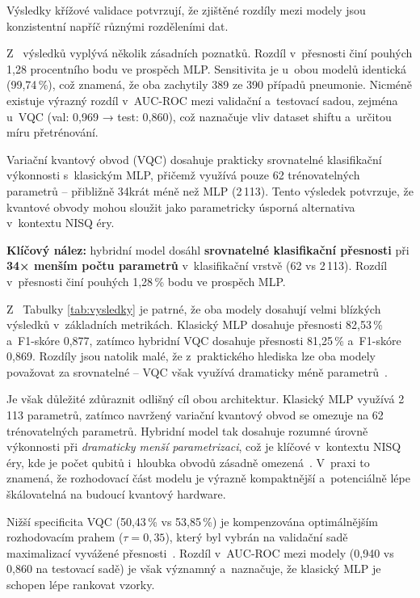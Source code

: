 \documentclass[12pt, a4paper]{report}
\begin{document}
Výsledky křížové validace potvrzují, že zjištěné rozdíly mezi modely jsou konzistentní napříč různými rozděleními dat.

Z ~výsledků vyplývá několik zásadních poznatků. Rozdíl v~přesnosti činí pouhých 1{,}28 procentního bodu ve prospěch MLP. Sensitivita je u~obou modelů identická (99{,}74\,\%), což znamená, že oba zachytily 389 ze 390 případů pneumonie. Nicméně existuje výrazný rozdíl v~AUC-ROC mezi validační a~testovací sadou, zejména u~VQC (val: 0{,}969 → test: 0{,}860), což naznačuje vliv dataset shiftu a~určitou míru přetrénování.

Variační kvantový obvod (VQC) dosahuje prakticky srovnatelné klasifikační výkonnosti s~klasickým MLP, přičemž využívá pouze 62 trénovatelných parametrů -- přibližně 34krát méně než MLP (2\,113). Tento výsledek potvrzuje, že kvantové obvody mohou sloužit jako parametricky úsporná alternativa v~kontextu NISQ éry.

\textbf{Klíčový nález:} hybridní model dosáhl \textbf{srovnatelné klasifikační přesnosti} při \textbf{34× menším počtu parametrů} v~klasifikační vrstvě (62 vs 2\,113). Rozdíl v~přesnosti činí pouhých 1{,}28\,\% bodu ve prospěch MLP.

Z ~Tabulky \ref{tab:vysledky} je patrné, že oba modely dosahují velmi blízkých výsledků v~základních metrikách. Klasický MLP dosahuje přesnosti 82{,}53\,\% a~F1-skóre 0{,}877, zatímco hybridní VQC dosahuje přesnosti 81{,}25\,\% a~F1-skóre 0{,}869. Rozdíly jsou natolik malé, že z~praktického hlediska lze oba modely považovat za srovnatelné -- VQC však využívá dramaticky méně parametrů~\cite{pneumonia_detection_qml}.

Je však důležité zdůraznit odlišný cíl obou architektur. Klasický MLP využívá 2\,113 parametrů, zatímco navržený variační kvantový obvod se omezuje na 62 trénovatelných parametrů. Hybridní model tak dosahuje rozumné úrovně výkonnosti při \emph{dramaticky menší parametrizaci}, což je klíčové v~kontextu NISQ éry, kde je počet qubitů i~hloubka obvodů zásadně omezená~\cite{mitarai_qcl}. V~praxi to znamená, že rozhodovací část modelu je výrazně kompaktnější a~potenciálně lépe škálovatelná na budoucí kvantový hardware.

Nižší specificita VQC (50{,}43\,\% vs 53{,}85\,\%) je kompenzována optimálnějším rozhodovacím prahem ($\tau = 0{,}35$), který byl vybrán na validační sadě maximalizací vyvážené přesnosti~\cite{radiologist_error_rate}. Rozdíl v~AUC-ROC mezi modely (0{,}940 vs 0{,}860 na testovací sadě) je však významný a~naznačuje, že klasický MLP je schopen lépe rankovat vzorky.
\end{document}

